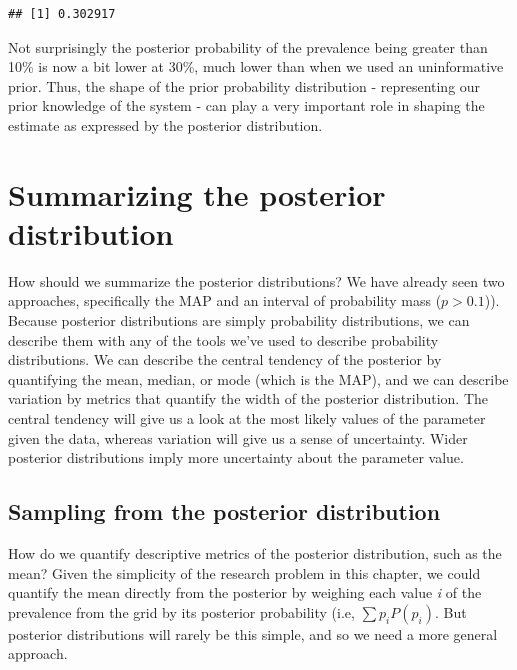 \documentclass[
]{book}
\newenvironment{Shaded}{\begin{snugshade}}{\end{snugshade}}
\newcommand{\FloatTok}[1]{\textcolor[rgb]{0.00,0.00,0.81}{#1}}
\newcommand{\FunctionTok}[1]{\textcolor[rgb]{0.13,0.29,0.53}{\textbf{#1}}}
\newcommand{\NormalTok}[1]{#1}
\newcommand{\SpecialCharTok}[1]{\textcolor[rgb]{0.81,0.36,0.00}{\textbf{#1}}}
\begin{document}
\begin{Shaded}
\end{Shaded}

\begin{verbatim}
## [1] 0.302917
\end{verbatim}

Not surprisingly the posterior probability of the prevalence being
greater than 10\% is now a bit lower at 30\%, much lower than when we used
an uninformative prior. Thus, the shape of the prior probability
distribution - representing our prior knowledge of the system - can play
a very important role in shaping the estimate as expressed by the
posterior distribution.

\section{Summarizing the posterior distribution}\label{summarizing-the-posterior-distribution}

How should we summarize the posterior distributions? We have already
seen two approaches, specifically the MAP and an interval of probability
mass (\(p>0.1\))). Because posterior distributions are simply probability
distributions, we can describe them with any of the tools we've used to
describe probability distributions. We can describe the central tendency
of the posterior by quantifying the mean, median, or mode (which is the
MAP), and we can describe variation by metrics that quantify the width
of the posterior distribution. The central tendency will give us a look
at the most likely values of the parameter given the data, whereas
variation will give us a sense of uncertainty. Wider posterior
distributions imply more uncertainty about the parameter value.

\subsection{Sampling from the posterior distribution}\label{sampling-from-the-posterior-distribution}

How do we quantify descriptive metrics of the posterior distribution,
such as the mean? Given the simplicity of the research problem in this
chapter, we could quantify the mean directly from the posterior by
weighing each value \emph{i} of the prevalence from the grid by its posterior
probability (i.e, \(\sum p_{i}P(p_{i})\). But posterior distributions will
rarely be this simple, and so we need a more general approach.
\end{document}
